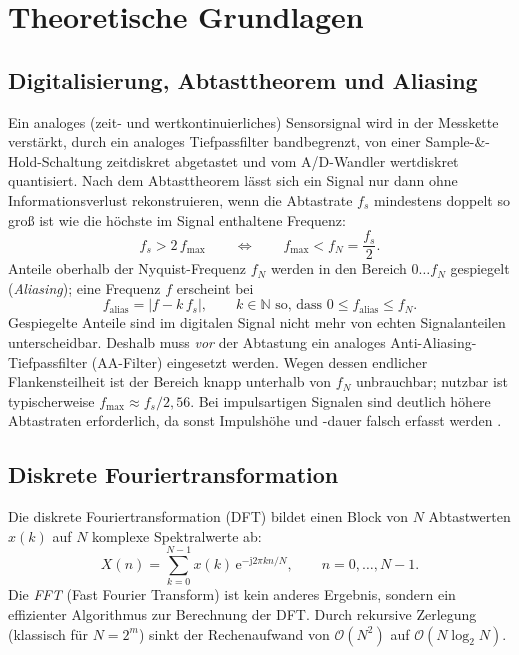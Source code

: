 \documentclass[a4paper,11pt,parskip=half,toc=listof,bibliography=totoc]{scrartcl}
\begin{document}
\section{Theoretische Grundlagen}

\subsection{Digitalisierung, Abtasttheorem und Aliasing}
Ein analoges (zeit- und wertkontinuierliches) Sensorsignal wird in der
Messkette verstärkt, durch ein analoges Tiefpassfilter bandbegrenzt, von
einer Sample-\&-Hold-Schaltung zeitdiskret abgetastet und vom A/D-Wandler
wertdiskret quantisiert. Nach dem Abtasttheorem lässt sich ein Signal nur
dann ohne Informationsverlust rekonstruieren, wenn die Abtastrate $f_s$
mindestens doppelt so groß ist wie die höchste im Signal enthaltene Frequenz:
\begin{equation}
  f_s > 2\,f_{\max} \qquad\Leftrightarrow\qquad f_{\max} < f_N = \frac{f_s}{2}.
\end{equation}
Anteile oberhalb der Nyquist-Frequenz $f_N$ werden in den Bereich
$0\ldots f_N$ gespiegelt (\emph{Aliasing}); eine Frequenz $f$ erscheint bei
\begin{equation}
  f_\text{alias} = \left| f - k\,f_s \right|, \qquad k \in \mathbb{N}
  \text{ so, dass } 0 \le f_\text{alias} \le f_N .
  \label{eq:alias}
\end{equation}
Gespiegelte Anteile sind im digitalen Signal nicht mehr von echten
Signalanteilen unterscheidbar. Deshalb muss \emph{vor} der Abtastung ein
analoges Anti-Aliasing-Tiefpassfilter (AA-Filter) eingesetzt werden. Wegen
dessen endlicher Flankensteilheit ist der Bereich knapp unterhalb von $f_N$
unbrauchbar; nutzbar ist typischerweise $f_{\max}\approx f_s/2{,}56$.
Bei impulsartigen Signalen sind deutlich höhere Abtastraten erforderlich,
da sonst Impulshöhe und -dauer falsch erfasst werden \cite{esefeld}.

\subsection{Diskrete Fouriertransformation}
Die diskrete Fouriertransformation (DFT) bildet einen Block von $N$
Abtastwerten $x(k)$ auf $N$ komplexe Spektralwerte ab:
\begin{equation}
  X(n) = \sum_{k=0}^{N-1} x(k)\, \mathrm{e}^{-\mathrm{j}2\pi kn/N},
  \qquad n = 0,\ldots,N-1 .
\end{equation}
Die \emph{FFT} (Fast Fourier Transform) ist kein anderes Ergebnis, sondern
ein effizienter Algorithmus zur Berechnung der DFT. Durch rekursive Zerlegung
(klassisch für $N=2^m$) sinkt der Rechenaufwand von $\mathcal{O}(N^2)$ auf
$\mathcal{O}(N\log_2 N)$.
\end{document}
